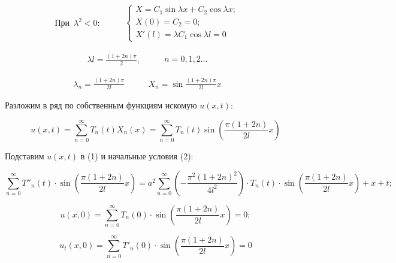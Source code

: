 \begin{equation*}
  \begin{split}
    \text{При}\,\,\, \lambda^{2} < 0:
  \end{split}
\quad\quad
  \begin{split}
  	\begin{cases}
  		X = C_{1}\sin{\lambda x} + C_{2}\cos{\lambda x};\\
  		X(0) = C_{2} = 0;\\
  		X'(l) = \lambda C_{1}\cos{\lambda l} = 0
  	\end{cases}
  \end{split}
\quad\quad
\end{equation*}

\begin{equation*}
  \begin{split}
    \lambda l = \frac{(1 + 2n)\pi}{2},
  \end{split}
\quad\quad
  \begin{split}
    n=0,1,2\ldots
  \end{split}
\quad\quad
\end{equation*}

\begin{equation*}
  \begin{split}
    \boxed{\lambda_{n} = \frac{(1 + 2n)\pi}{2l}}
  \end{split}
\quad\quad
  \begin{split}
    \boxed{X_{n} = \sin{\frac{(1 + 2n)\pi}{2l}x}}
  \end{split}
\quad\quad
\end{equation*}

Разложим в ряд по собственным функциям искомую $u(x, t)$:

$$u(x, t) = \sum_{n=0}^{\infty}T_{n}(t)X_{n}(x) = \sum_{n=0}^{\infty} T_{n}(t) \sin \left( \frac{\pi(1 +2n)}{2l}x \right)$$

Подставим $u(x, t)$ в (1) и начальные условия (2):

$$\sum_{n=0}^{\infty}T''_{n}(t)\cdot \sin \left( \frac{\pi(1 + 2n)}{2l}x \right) = a^{2}\sum_{n=0}^{\infty}\left( -\frac{\pi^{2}(1 + 2n)^{2}}{4l^{2}}\right) \cdot T_{n}(t) \cdot \sin\left( \frac{\pi(1 + 2n)}{2l}x \right) +x + t;$$

$$u(x, 0) = \sum_{n=0}^{\infty} T_{n}(0) \cdot \sin\left( \frac{\pi(1 + 2n)}{2l}x \right) = 0;$$

$$u_{t}(x, 0) = \sum_{n=0}^{\infty} T'_{n}(0) \cdot \sin\left( \frac{\pi(1 + 2n)}{2l}x \right) = 0$$

